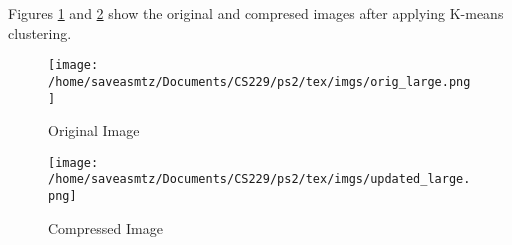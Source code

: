 
\begin{answer}

Figures \ref{fig:orig_large} and \ref{fig:updated_large} show the original and compresed images after applying K-means clustering.
\begin{figure}
    \centering
    \texttt{[image: /home/saveasmtz/Documents/CS229/ps2/tex/imgs/orig\_large.png]}
    \caption{Original Image}
    \label{fig:orig_large}
\end{figure}

\begin{figure}
    \centering
    \texttt{[image: /home/saveasmtz/Documents/CS229/ps2/tex/imgs/updated\_large.png]}
    \caption{Compressed Image}
    \label{fig:updated_large}
\end{figure}

\end{answer}
